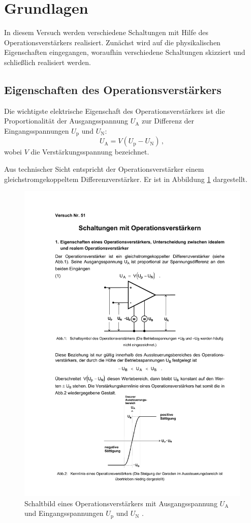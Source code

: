 \section{Grundlagen}
\label{sec:grundlagen}
In diesem Versuch werden verschiedene Schaltungen mit Hilfe des
Operationsverstärkers realisiert.
Zunächst wird auf die physikalischen Eigenschaften eingegangen,
woraufhin verschiedene Schaltungen skizziert und schließlich
realisiert werden.

\subsection{Eigenschaften des Operationsverstärkers}
\label{subsec:eigenschaften}
Die wichtigste elektrische Eigenschaft des Operationsverstärkers
ist die Proportionalität der Ausgangsspannung $U_\text{A}$ zur
Differenz der Eingangsspannungen $U_\text{p}$ und $U_\text{N}$:
\begin{equation}
\label{eq:proportionalität}
    U_\text{A} = V(U_\text{p} - U_\text{N})\,,
\end{equation}
wobei $V$ die Verstärkungsspannung bezeichnet.

Aus technischer Sicht entspricht der Operationsverstärker einem
gleichstromgekoppeltem Differenzverstärker. Er ist in Abbildung
\ref{fig:op} dargestellt.
\begin{figure}
    \centering
    \includegraphics[width=0.7\linewidth]{img/op.pdf}
    \caption{
        Schaltbild eines Operationsverstärkers mit Ausgangsspannung
        $U_\text{A}$ und Eingangsspannungen $U_\text{p}$ und
        $U_\text{N}$ \cite{V51}.
    }
    \label{fig:op}
\end{figure}
